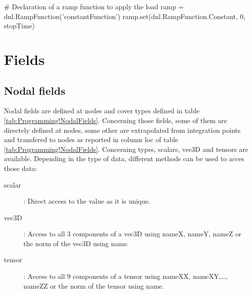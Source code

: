 \begin{PythonListing}
# Declaration of a ramp function to apply the load
ramp = dnl.RampFunction('constantFunction')
ramp.set(dnl.RampFunction.Constant, 0, stopTime)
\end{PythonListing}

\section{Fields}\label{ProgrammingLanguage:Section:Fields}

\subsection{Nodal fields}

Nodal fields are defined at nodes and cover types defined in table \ref{tab:Programming!NodalFields}. Concerning those fields, some of them are directely defined at nodes, some other are extrapolated from integration points and transfered to nodes as reported in column \textsf{loc} of table \ref{tab:Programming!NodalFields}. Concerning types, \textsf{scalars}, \textsf{vec3D} and \textsf{tensors} are available. Depending in the type of data, different methods can be used to acces those data:
\begin{description}
	\item [{scalar}] : Direct access to the value as it is unique.
	\item [{vec3D}] : Access to all $3$ components of a vec3D using \textsf{nameX}, \textsf{nameY}, \textsf{nameZ} or the norm of the vec3D using \textsf{name}.
	\item [{tensor}] : Access to all $9$ components of a tensor using \textsf{nameXX}, \textsf{nameXY},\ldots, \textsf{nameZZ} or the norm of the tensor using \textsf{name}.
\end{description}
